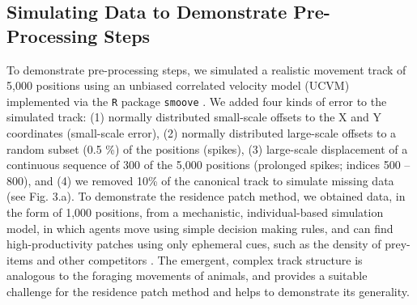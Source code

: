 \begin{refsection}


    \subsection{Simulating Data to Demonstrate Pre-Processing Steps}

    To demonstrate pre-processing steps, we simulated a realistic movement track of 5,000 positions using an unbiased correlated velocity model (UCVM) implemented via the \texttt{R} package \texttt{smoove} \citep[][see Fig. 3.a]{gurarie2017}.
    We added four kinds of error to the simulated track: (1) normally distributed small-scale offsets to the X and Y coordinates (small-scale error), (2) normally distributed large-scale offsets to a random subset (0.5 \%) of the positions (spikes), (3) large-scale displacement of a continuous sequence of 300 of the 5,000 positions (prolonged spikes; indices 500 -- 800), and (4) we removed 10\% of the canonical track to simulate missing data (see Fig. 3.a).
    To demonstrate the residence patch method, we obtained data, in the form of 1,000 positions, from a mechanistic, individual-based simulation model, in which agents move using simple decision making rules, and can find high-productivity patches using only ephemeral cues, such as the density of prey-items and other competitors \citep{gupte2021a, netz2021}.
    The emergent, complex track structure is analogous to the foraging movements of animals, and provides a suitable challenge for the residence patch method and helps to demonstrate its generality.


\end{refsection}
